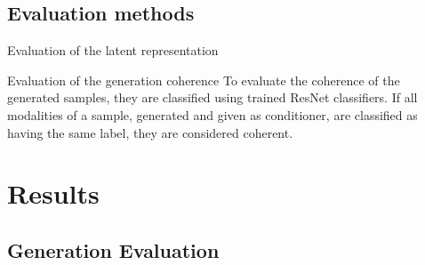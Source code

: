         \subsection{Evaluation methods}
        \begin{frame}{Evaluation of the latent representation}
        \begin{figure}[!h]
        \centering
        \end{figure}    
        \end{frame}
        
        \begin{frame}{Evaluation of the generation coherence}
        To evaluate the coherence of the generated samples, they are classified using trained ResNet classifiers.
        If all modalities of a sample, generated and given as conditioner, are classified as having the same label, they are considered coherent.
        \end{frame}
        
    \section{Results}
        \subsection{Generation Evaluation}
        
    
        
\printbibliography

